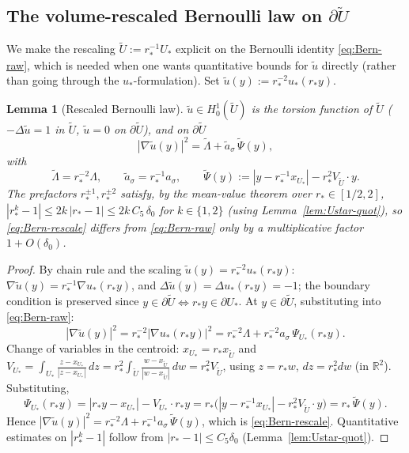 \documentclass[11pt]{amsart}
\newtheorem{lemma}[theorem]{Lemma}
\newcommand{\R}{\mathbb R}
\newcommand{\wt}{\widetilde}
\begin{document}
\subsection{The volume-rescaled Bernoulli law on
\(\partial\wt U\)}\label{ss:Bern-rescale}

We make the rescaling \(\wt U:=r_*^{-1}U_*\) explicit on the
Bernoulli identity \eqref{eq:Bern-raw}, which is needed when one wants
quantitative bounds for \(\wt u\) directly (rather than going through
the \(u_*\)-formulation).  Set \(\wt u(y):=r_*^{-2}u_{*}(r_*y)\).

\begin{lemma}[Rescaled Bernoulli law]\label{lem:bern-rescale}
\(\wt u\in H^{1}_{0}(\wt U)\) is the torsion function of \(\wt U\)
(\(-\Delta\wt u=1\) in \(\wt U\), \(\wt u=0\) on \(\partial\wt U\)),
and on \(\partial\wt U\)
\begin{equation}\label{eq:Bern-rescale}
   |\nabla\wt u(y)|^{2}=\wt\Lambda+\wt a_\sigma\,\wt\Psi(y),
\end{equation}
with
\[
   \wt\Lambda=r_{*}^{-2}\Lambda,
   \qquad
   \wt a_\sigma=r_{*}^{-1}a_\sigma,
   \qquad
   \wt\Psi(y):=|y-r_{*}^{-1}x_{U_*}|-r_{*}^{2}V_{\wt U}\cdot y.
\]
The prefactors \(r_*^{\pm 1},r_*^{\pm 2}\) satisfy, by the mean-value
theorem over \(r_*\in[1/2,2]\),
\(|r_*^{k}-1|\le 2k\,|r_*-1|\le 2k\,C_5\,\delta_0\) for
\(k\in\{1,2\}\) (using Lemma~\ref{lem:Ustar-quot}), so
\eqref{eq:Bern-rescale} differs from \eqref{eq:Bern-raw} only by a
multiplicative factor \(1+O(\delta_0)\).
\end{lemma}

\begin{proof}
By chain rule and the scaling \(\wt u(y)=r_*^{-2}u_*(r_*y)\):
\(\nabla\wt u(y)=r_*^{-1}\nabla u_*(r_*y)\), and
\(\Delta\wt u(y)=\Delta u_*(r_*y)=-1\); the boundary condition is
preserved since \(y\in\partial\wt U\iff r_*y\in\partial U_*\).  At
\(y\in\partial\wt U\), substituting into \eqref{eq:Bern-raw}:
\[
   |\nabla\wt u(y)|^{2}
      =r_*^{-2}|\nabla u_*(r_*y)|^{2}
      =r_*^{-2}\Lambda
       +r_*^{-2}a_\sigma\,\Psi_{U_*}(r_*y).
\]
Change of variables in the centroid: \(x_{U_*}=r_*x_{\wt U}\) and
\(V_{U_*}=\int_{U_*}\frac{z-x_{U_*}}{|z-x_{U_*}|}\,dz
=r_*^{2}\int_{\wt U}\frac{w-x_{\wt U}}{|w-x_{\wt U}|}\,dw
=r_*^{2}V_{\wt U}\), using \(z=r_*w\), \(dz=r_*^{2}dw\) (in
\(\R^{2}\)).  Substituting,
\[
   \Psi_{U_*}(r_*y)=|r_*y-x_{U_*}|-V_{U_*}\cdot r_*y
      =r_*\bigl(|y-r_*^{-1}x_{U_*}|-r_*^{2}V_{\wt U}\cdot y\bigr)
      =r_*\,\wt\Psi(y).
\]
Hence \(|\nabla\wt u(y)|^{2}=r_*^{-2}\Lambda+r_*^{-1}a_\sigma\,\wt
\Psi(y)\), which is \eqref{eq:Bern-rescale}.  Quantitative estimates
on \(|r_*^{k}-1|\) follow from \(|r_*-1|\le C_5\delta_0\)
(Lemma~\ref{lem:Ustar-quot}).
\end{proof}
\end{document}
